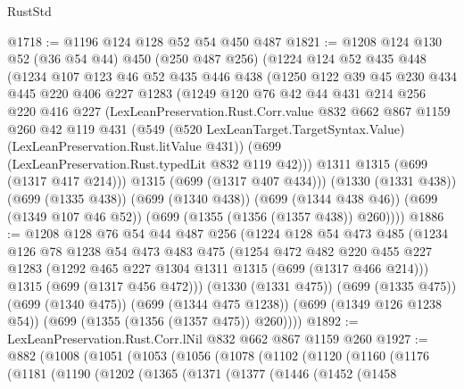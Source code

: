 \begin{lexlean}{RustStd}
\begin{coremodule}
@1718 := @1196 @124 @128 @52 @54 @450 @487
@1821 := @1208
    @124
    @130
    @52
    (@36 @54 @44)
    @450
    (@250 @487 @256)
    (@1224
      @124
      @52
      @435
      @448
      (@1234
        @107
        @123
        @46
        @52
        @435
        @446
        @438
        (@1250
          @122
          @39
          @45
          @230
          @434
          @445
          @220
          @406
          @227
          @1283
          (@1249
            @120
            @76
            @42
            @44
            @431
            @214
            @256
            @220
            @416
            @227
            (LexLeanPreservation.Rust.Corr.value
              @832
              @662
              @867
              @1159
              @260
              @42
              @119
              @431
              (@549
                (@520 LexLeanTarget.TargetSyntax.Value)
                (LexLeanPreservation.Rust.litValue @431))
              (@699 (LexLeanPreservation.Rust.typedLit @832 @119 @42)))
            @1311
            @1315
            (@699 (@1317 @417 @214)))
          @1315
          (@699 (@1317 @407 @434)))
        (@1330 (@1331 @438))
        (@699 (@1335 @438))
        (@699 (@1340 @438))
        (@699 (@1344 @438 @46))
        (@699 (@1349 @107 @46 @52))
        (@699 (@1355 (@1356 (@1357 @438)) @260))))
@1886 := @1208
    @128
    @76
    @54
    @44
    @487
    @256
    (@1224
      @128
      @54
      @473
      @485
      (@1234
        @126
        @78
        @1238
        @54
        @473
        @483
        @475
        (@1254
          @472
          @482
          @220
          @455
          @227
          @1283
          (@1292 @465 @227 @1304 @1311 @1315 (@699 (@1317 @466 @214)))
          @1315
          (@699 (@1317 @456 @472)))
        (@1330 (@1331 @475))
        (@699 (@1335 @475))
        (@699 (@1340 @475))
        (@699 (@1344 @475 @1238))
        (@699 (@1349 @126 @1238 @54))
        (@699 (@1355 (@1356 (@1357 @475)) @260))))
@1892 := LexLeanPreservation.Rust.Corr.lNil @832 @662 @867 @1159 @260
@1927 := @882
    (@1008
      (@1051
        (@1053
          (@1056
            (@1078
              (@1102
                (@1120
                  (@1160
                    (@1176
                      (@1181
                        (@1190
                          (@1202
                            (@1365
                              (@1371
                                (@1377
                                  (@1446
                                    (@1452
                                      (@1458

\end{coremodule}
\end{lexlean}
